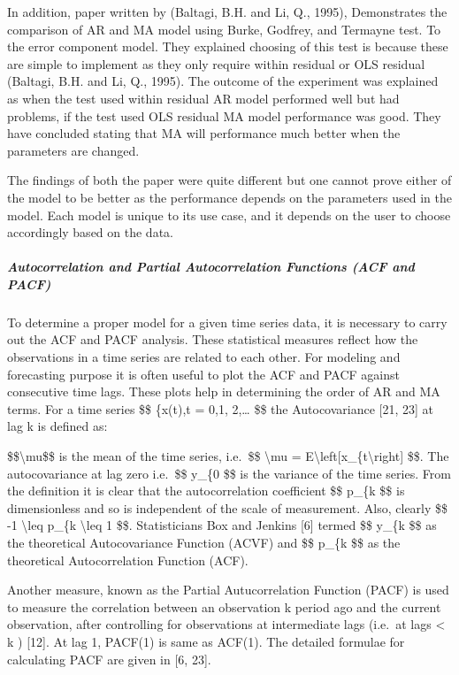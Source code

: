 \documentclass[
  letterpaper,
  DIV=11,
  numbers=noendperiod]{scrartcl}
\let\oldsubparagraph\subparagraph
\renewcommand{\subparagraph}[1]{\oldsubparagraph{#1}\mbox{}}
\begin{document}
In addition, paper written by (Baltagi, B.H. and Li, Q., 1995),
Demonstrates the comparison of AR and MA model using Burke, Godfrey, and
Termayne test. To the error component model. They explained choosing of
this test is because these are simple to implement as they only require
within residual or OLS residual (Baltagi, B.H. and Li, Q., 1995). The
outcome of the experiment was explained as when the test used within
residual AR model performed well but had problems, if the test used OLS
residual MA model performance was good. They have concluded stating that
MA will performance much better when the parameters are changed.

The findings of both the paper were quite different but one cannot prove
either of the model to be better as the performance depends on the
parameters used in the model. Each model is unique to its use case, and
it depends on the user to choose accordingly based on the data.

\hypertarget{autocorrelation-and-partial-autocorrelation-functions-acf-and-pacf}{%
\subparagraph{\texorpdfstring{\textbf{Autocorrelation and Partial
Autocorrelation Functions (ACF and
PACF)}}{Autocorrelation and Partial Autocorrelation Functions (ACF and PACF)}}\label{autocorrelation-and-partial-autocorrelation-functions-acf-and-pacf}}

To determine a proper model for a given time series data, it is
necessary to carry out the ACF and PACF analysis. These statistical
measures reflect how the observations in a time series are related to
each other. For modeling and forecasting purpose it is often useful to
plot the ACF and PACF against consecutive time lags. These plots help in
determining the order of AR and MA terms. For a time series \$\$
\{x(t),t = 0,1, 2,\ldots{} \$\$ the Autocovariance {[}21, 23{]} at lag k
is defined as:

\$\$\textbackslash mu\$\$ is the mean of the time series, i.e.~\$\$
\textbackslash mu = E\textbackslash left{[}x\_\{t\textbackslash right{]}
\$\$. The autocovariance at lag zero i.e.~\$\$ y\_\{0 \$\$ is the
variance of the time series. From the definition it is clear that the
autocorrelation coefficient \$\$ p\_\{k \$\$ is dimensionless and so is
independent of the scale of measurement. Also, clearly \$\$ -1
\textbackslash leq p\_\{k \textbackslash leq 1 \$\$. Statisticians Box
and Jenkins {[}6{]} termed \$\$ y\_\{k \$\$ as the theoretical
Autocovariance Function (ACVF) and \$\$ p\_\{k \$\$ as the theoretical
Autocorrelation Function (ACF).

Another measure, known as the Partial Autucorrelation Function (PACF) is
used to measure the correlation between an observation k period ago and
the current observation, after controlling for observations at
intermediate lags (i.e.~at lags \textless{} k ) {[}12{]}. At lag 1,
PACF(1) is same as ACF(1). The detailed formulae for calculating PACF
are given in {[}6, 23{]}.
\end{document}
